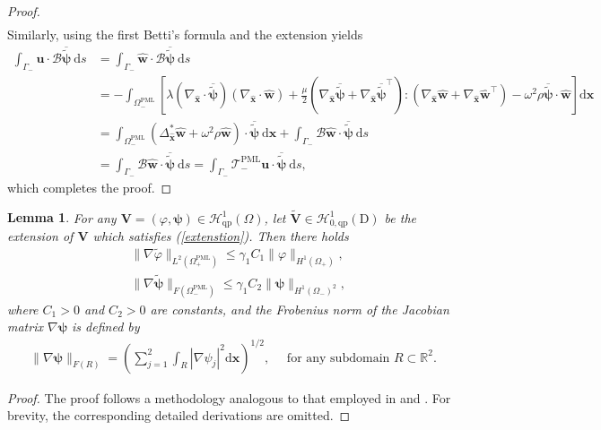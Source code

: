 \documentclass[final,3p,times]{elsarticle}
\newtheorem{lemma}{Lemma}
\begin{document}
\begin{proof}
\begin{align*}
	\end{align*}
	Similarly, using the first Betti's formula and the extension yields
	\begin{align*}
		\int_{\Gamma_-} \boldsymbol{u} \cdot \mathscr{B} \overline{\tilde{\boldsymbol{\psi}}} \mathrm{~d} s & =\int_{\Gamma_-} \hat{\boldsymbol{w}} \cdot \mathscr{B} \overline{\tilde{\boldsymbol{\psi}}} \mathrm{~d} s \\
		&= -\int_{\Omega_-^{\mathrm{PML}}}\left[\lambda(\nabla_{\hat{\boldsymbol{x}}} \cdot \overline{\tilde{\boldsymbol{\psi}}})(\nabla_{\hat{\boldsymbol{x}}} \cdot \hat{\boldsymbol{w}})+\frac{\mu}{2}\left(\nabla_{\hat{\boldsymbol{x}}} \overline{\tilde{\boldsymbol{\psi}}}+\nabla_{\hat{\boldsymbol{x}}}  \overline{\tilde{\boldsymbol{\psi}}}^{\top}\right):\left(\nabla_{\hat{\boldsymbol{x}}} \hat{\boldsymbol{w}}+\nabla_{\hat{\boldsymbol{x}}} \hat{\boldsymbol{w}}^{\top}\right)-\omega^2\rho \overline{\tilde{\boldsymbol{\psi}}} \cdot \hat{\boldsymbol{w}}\right] \mathrm{d} \boldsymbol{x} \\
		& =\int_{\Omega_-^{\mathrm{PML}}}\left(\Delta^*_{\hat{\boldsymbol{x}}}\hat{\boldsymbol{w}}+\omega^2\rho \hat{\boldsymbol{w}}\right) \cdot \overline{\tilde{\boldsymbol{\psi}}} \mathrm{~d} \boldsymbol{x}+\int_{\Gamma_-} \mathscr{B} \hat{\boldsymbol{w}} \cdot \overline{\tilde{\boldsymbol{\psi}}} \mathrm{~d} s \\
		& =\int_{\Gamma_-} \mathscr{B} \hat{\boldsymbol{w}} \cdot \overline{\tilde{\boldsymbol{\psi}}} \mathrm{~d} s=\int_{\Gamma_-} \mathscr{T}_-^{\mathrm{PML}} \boldsymbol{u} \cdot \overline{\tilde{\boldsymbol{\psi}}} \mathrm{~d} s,
	\end{align*}
	which completes the proof.
\end{proof}
\begin{lemma}\label{lemma6}
	For any $\boldsymbol{V}=(\varphi,\boldsymbol{\psi}) \in \mathscr{H}^1_\mathrm{qp}\left(\Omega\right)$, let $\tilde{\boldsymbol{V}} \in \mathscr{H}_{0,\mathrm{qp}}^1(\mathrm{D})$ be the extension of $\boldsymbol{V}$ which satisfies (\ref{extenstion}). Then there holds
	\begin{align*}
		& \|\nabla \tilde{\varphi}\|_{L^2\left(\Omega_+^{\mathrm{PML}}\right)} \leq \gamma_1 C_1\|\varphi\|_{H^1(\Omega_+)},\\
		& \|\nabla \tilde{\boldsymbol{\psi}}\|_{F\left(\Omega_-^{\mathrm{PML}}\right)} \leq \gamma_1 C_2\|\boldsymbol{\psi}\|_{H^1(\Omega_-)^2},
	\end{align*}
	where $C_1>0$ and $C_2>0$ are 
	constants, and the Frobenius norm of the Jacobian matrix $\nabla \boldsymbol{\psi}$ is defined by
	\begin{align*}
		\|\nabla \boldsymbol{\psi}\|_{F(R)}=\left(\sum_{j=1}^2 \int_R\left|\nabla \psi_j\right|^2 \mathrm{d} \boldsymbol{x}\right)^{1 / 2}, \quad \text { for any subdomain } R \subset \mathbb{R}^2. 
	\end{align*}
\end{lemma}
\begin{proof}
	The proof follows a methodology analogous to that employed in \cite[Lemma 4.3]{Chen03} and \cite[Lemma 4.3]{Jiang17-3}. For brevity, the corresponding detailed derivations are omitted.
\end{proof}
\end{document}
